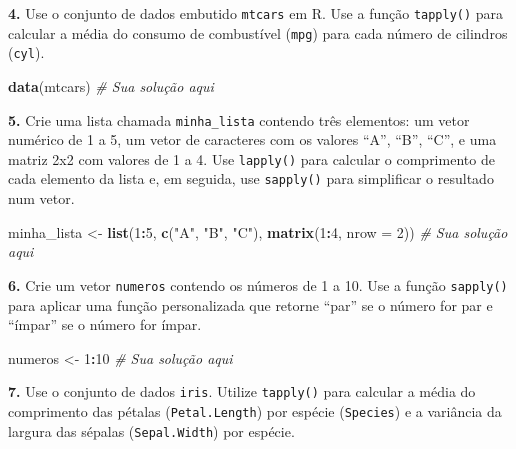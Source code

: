 \documentclass[
]{book}
\newenvironment{Shaded}{\begin{snugshade}}{\end{snugshade}}
\newcommand{\AttributeTok}[1]{\textcolor[rgb]{0.13,0.29,0.53}{#1}}
\newcommand{\CommentTok}[1]{\textcolor[rgb]{0.56,0.35,0.01}{\textit{#1}}}
\newcommand{\DecValTok}[1]{\textcolor[rgb]{0.00,0.00,0.81}{#1}}
\newcommand{\FunctionTok}[1]{\textcolor[rgb]{0.13,0.29,0.53}{\textbf{#1}}}
\newcommand{\NormalTok}[1]{#1}
\newcommand{\OtherTok}[1]{\textcolor[rgb]{0.56,0.35,0.01}{#1}}
\newcommand{\SpecialCharTok}[1]{\textcolor[rgb]{0.81,0.36,0.00}{\textbf{#1}}}
\newcommand{\StringTok}[1]{\textcolor[rgb]{0.31,0.60,0.02}{#1}}
\begin{document}
\textbf{4.} Use o conjunto de dados embutido \texttt{mtcars} em R. Use a função
\texttt{tapply()} para calcular a média do consumo de combustível (\texttt{mpg}) para
cada número de cilindros (\texttt{cyl}).

\begin{Shaded}
\begin{Highlighting}[]
\FunctionTok{data}\NormalTok{(mtcars)}
\CommentTok{\# Sua solução aqui}
\end{Highlighting}
\end{Shaded}

\textbf{5.} Crie uma lista chamada \texttt{minha\_lista} contendo três elementos: um
vetor numérico de 1 a 5, um vetor de caracteres com os valores ``A'', ``B'',
``C'', e uma matriz 2x2 com valores de 1 a 4. Use \texttt{lapply()} para calcular
o comprimento de cada elemento da lista e, em seguida, use \texttt{sapply()}
para simplificar o resultado num vetor.

\begin{Shaded}
\begin{Highlighting}[]
\NormalTok{minha\_lista }\OtherTok{\textless{}{-}} \FunctionTok{list}\NormalTok{(}\DecValTok{1}\SpecialCharTok{:}\DecValTok{5}\NormalTok{, }\FunctionTok{c}\NormalTok{(}\StringTok{"A"}\NormalTok{, }\StringTok{"B"}\NormalTok{, }\StringTok{"C"}\NormalTok{), }\FunctionTok{matrix}\NormalTok{(}\DecValTok{1}\SpecialCharTok{:}\DecValTok{4}\NormalTok{, }\AttributeTok{nrow =} \DecValTok{2}\NormalTok{))}
\CommentTok{\# Sua solução aqui}
\end{Highlighting}
\end{Shaded}

\textbf{6.} Crie um vetor \texttt{numeros} contendo os números de 1 a 10. Use a função
\texttt{sapply()} para aplicar uma função personalizada que retorne ``par'' se o
número for par e ``ímpar'' se o número for ímpar.

\begin{Shaded}
\begin{Highlighting}[]
\NormalTok{numeros }\OtherTok{\textless{}{-}} \DecValTok{1}\SpecialCharTok{:}\DecValTok{10}
\CommentTok{\# Sua solução aqui}
\end{Highlighting}
\end{Shaded}

\textbf{7.} Use o conjunto de dados \texttt{iris}. Utilize \texttt{tapply()} para calcular
a média do comprimento das pétalas (\texttt{Petal.Length}) por espécie
(\texttt{Species}) e a variância da largura das sépalas (\texttt{Sepal.Width}) por
espécie.
\end{document}
